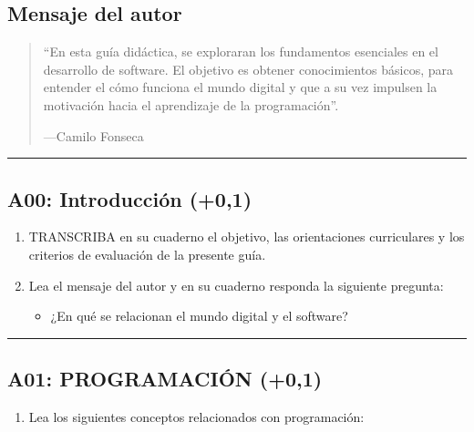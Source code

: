 \documentclass[letterpaper,10pt,spanish]{sphinxmanual}
\begin{document}
\subsection{Mensaje del autor}
\label{\detokenize{1_guias/10programacion/G1021:mensaje-del-autor}}\begin{quote}

\sphinxAtStartPar
“En esta guía didáctica, se exploraran los fundamentos esenciales en el desarrollo de software. El objetivo es obtener conocimientos básicos, para entender el cómo funciona el mundo digital y que a su vez impulsen la motivación hacia el aprendizaje de la programación”.

\begin{flushright}
---Camilo Fonseca
\end{flushright}
\end{quote}


\bigskip\hrule\bigskip



\subsection{A00: Introducción (+0,1)}
\label{\detokenize{1_guias/10programacion/G1021:a00-introduccion-0-1}}
\sphinxAtStartPar
{}
\begin{enumerate}
%
\item {} 
\sphinxAtStartPar
TRANSCRIBA en su cuaderno el objetivo, las orientaciones curriculares y los criterios de evaluación de la presente guía.

\item {} 
\sphinxAtStartPar
Lea el mensaje del autor y en su cuaderno responda la siguiente pregunta:
\begin{itemize}
\item {} 
\sphinxAtStartPar
¿En qué se relacionan el mundo digital y el software?

\end{itemize}

\end{enumerate}


\bigskip\hrule\bigskip



\subsection{A01: PROGRAMACIÓN (+0,1)}
\label{\detokenize{1_guias/10programacion/G1021:a01-programacion-0-1}}
\sphinxAtStartPar
{}
\begin{enumerate}
%
\item {} 
\sphinxAtStartPar
Lea los siguientes conceptos relacionados con programación:

\end{enumerate}
\end{document}
